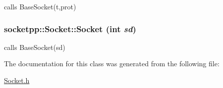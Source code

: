 calls BaseSocket(t,prot) 

\hypertarget{classsocketpp_1_1Socket_2ec875f75becab573f7720d50ab13c99}{
\subsubsection[{Socket}]{\setlength{\rightskip}{0pt plus 5cm}socketpp::Socket::Socket (int {\em sd})}}
\label{classsocketpp_1_1Socket_2ec875f75becab573f7720d50ab13c99}


calls BaseSocket(sd) 



The documentation for this class was generated from the following file:\begin{CompactItemize}
\item 
\hyperlink{Socket_8h}{Socket.h}\end{CompactItemize}
